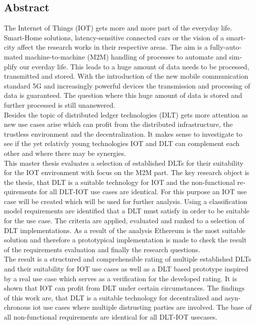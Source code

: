 

\begin{otherlanguage}{american}
	\chapter*{Abstract}
	The Internet of Things (IOT) gets more and more part of the everyday life. Smart-Home solutions, latency-sensitive connected cars or the vision of a smart-city affect the research works in their respective areas. The aim is a fully-automated machine-to-machine (M2M) handling of processes to automate and simplify our everday life. This leads to a huge amount of data needs to be processed, transmitted and stored. With the introduction of the new mobile communication standard 5G and increasingly powerful devices the transmission and processing of data is guaranteed. The question where this huge amount of data is stored and further processed is still unanswered.\\
	Besides the topic of distributed ledger technologies (DLT) gets more attention as new use cases arise which can profit from the distributed infrastructure, the trustless environment and the decentralization. It makes sense to investigate to see if the yet relativly young technologies IOT and DLT can complement each other and where there may be synergies.\\
	This master thesis evaluates a selection of established DLTs for their suitability for the IOT environment with focus on the M2M part. The key research object is the thesis, that DLT is a suitable technology for IOT and the non-functional requirements for all DLT-IOT use cases are identical. For this purpose an IOT use case will be created which will be used for further analysis. Using a classification model requirements are identified that a DLT must satisfy in order to be suitable for the use case. The criteria are applied, evaluated and ranked to a selection of DLT implementations. As a result of the analysis Ethereum is the most suitable solution and therefore a prototypical implementation is made to check the result of the requirements evaluation and finally the research questions.\\
	The result is a structured and comprehensible rating of multiple established DLTs and their suitability for IOT use cases as well as a DLT based prototype inspired by a real use case which serves as a verification for the developed rating. It is shown that IOT can profit from DLT under certain circumstances. The findings of this work are, that DLT is a suitable technology for decentralized and asynchronous iot use cases where multiple distrusting parties are involved. The base of all non-functional requirements are identical for all DLT-IOT usecases.
\end{otherlanguage}
